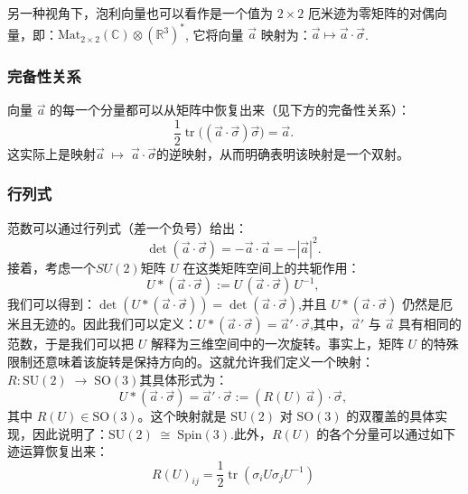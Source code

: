 另一种视角下，泡利向量也可以看作是一个值为 $2\times 2$ 厄米迹为零矩阵的对偶向量，即：$\text{Mat}_{2\times 2}(\mathbb{C}) \otimes (\mathbb{R}^3)^*$,
它将向量 $\vec{a}$ 映射为：$\vec{a} \mapsto \vec{a} \cdot \vec{\sigma}$.
\subsubsection{完备性关系}
向量 $\vec{a}$ 的每一个分量都可以从矩阵中恢复出来（见下方的完备性关系）：
$$
\frac{1}{2} \operatorname{tr} \bigl( (\vec{a} \cdot \vec{\sigma}) \vec{\sigma} \bigr) = \vec{a}.~
$$
这实际上是映射$\vec{a} \;\mapsto\; \vec{a} \cdot \vec{\sigma}$的逆映射，从而明确表明该映射是一个双射。
\subsubsection{行列式}
范数可以通过行列式（差一个负号）给出：
$$
\det(\vec{a} \cdot \vec{\sigma}) = -\vec{a} \cdot \vec{a} = -|\vec{a}|^2.~
$$
接着，考虑一个$SU(2)$矩阵 $U$ 在这类矩阵空间上的共轭作用：
$$
U * (\vec{a} \cdot \vec{\sigma}) := U\,(\vec{a} \cdot \vec{\sigma})\,U^{-1},~
$$
我们可以得到：$\det(U * (\vec{a} \cdot \vec{\sigma})) = \det(\vec{a} \cdot \vec{\sigma})$,并且 $U * (\vec{a} \cdot \vec{\sigma})$ 仍然是厄米且无迹的。因此我们可以定义：$U * (\vec{a} \cdot \vec{\sigma}) = \vec{a}' \cdot \vec{\sigma}$,其中，$\vec{a}'$ 与 $\vec{a}$ 具有相同的范数，于是我们可以把 $U$ 解释为三维空间中的一次旋转。事实上，矩阵 $U$ 的特殊限制还意味着该旋转是保持方向的。这就允许我们定义一个映射：$R: \mathrm{SU}(2) \;\longrightarrow\; \mathrm{SO}(3)$其具体形式为：
$$
U * (\vec{a} \cdot \vec{\sigma}) = \vec{a}' \cdot \vec{\sigma} := (R(U)\,\vec{a}) \cdot \vec{\sigma},~
$$
其中 $R(U) \in \mathrm{SO}(3)$。这个映射就是 $\mathrm{SU}(2)$ 对 $\mathrm{SO}(3)$ 的双覆盖的具体实现，因此说明了：$\mathrm{SU}(2) \;\cong\; \mathrm{Spin}(3)$.此外，$R(U)$ 的各个分量可以通过如下迹运算恢复出来：
$$
R(U)_{ij} = \frac{1}{2} \operatorname{tr}(\sigma_i U \sigma_j U^{-1})~
$$
